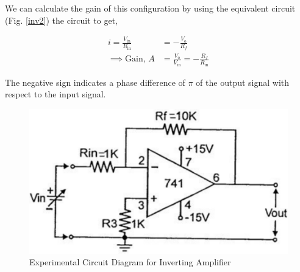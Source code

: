 We can calculate the gain of this configuration by using the equivalent circuit (Fig. \ref{inv2}) the circuit to get,

\begin{align}
    i = \frac{V_\text{in}}{R_\text{in}} &= -\frac{V_\text{o}}{R_f} \nonumber \\
    \implies \text{Gain, } A &= \frac{V_\text{o}}{V_\text{in}} = -\frac{R_f}{R_\text{in}} \label{inv gain}
\end{align}

The negative sign indicates a phase difference of $\pi$ of the output signal with respect to the input signal.


    

\begin{figure}[H]
    \centering
    \includegraphics[width=0.8\columnwidth]{images/inv3.png}
    \caption{Experimental Circuit Diagram for Inverting Amplifier}
    \label{inv3}
\end{figure}

